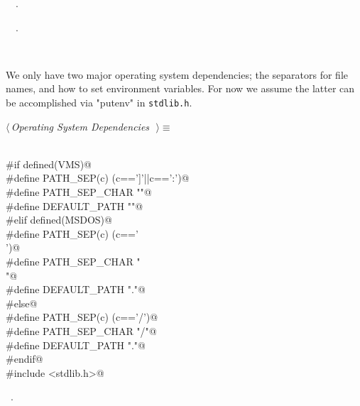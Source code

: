 \documentclass{report}
\begin{document}
\begin{flushleft}
\begin{minipage}{\linewidth}
\begin{list}{}{\setlength{\itemsep}{-\parsep}\setlength{\itemindent}{-\leftmargin}}
\item \NWtxtIdentsDefed\nobreak\  \verb@main@\nobreak\ \NWtxtIdentsNotUsed.\end{list}
\vspace{-2ex}
\footnotesize\addtolength{\baselineskip}{-1ex}
\begin{list}{}{\setlength{\itemsep}{-\parsep}\setlength{\itemindent}{-\leftmargin}}
\item \NWtxtIdentsUsed\nobreak\  \verb@exit@\nobreak\ .\end{list}
\end{minipage}\\[4ex]
\end{flushleft}
We only have two major operating system dependencies; the separators for
file names, and how to set environment variables.  
For now we assume the latter can be accomplished 
via "putenv" in \verb|stdlib.h|.
\begin{flushleft} \small
\begin{minipage}{\linewidth} \label{scrap15}
$\langle\,${\it Operating System Dependencies}\nobreak\ {\footnotesize {}}$\,\rangle\equiv$
\vspace{-1ex}
\begin{list}{}{} \item
\mbox{}\verb@@\\
\mbox{}\verb@#if defined(VMS)@\\
\mbox{}\verb@#define PATH_SEP(c) (c==']'||c==':')@\\
\mbox{}\verb@#define PATH_SEP_CHAR ""@\\
\mbox{}\verb@#define DEFAULT_PATH ""@\\
\mbox{}\verb@#elif defined(MSDOS)@\\
\mbox{}\verb@#define PATH_SEP(c) (c=='\\')@\\
\mbox{}\verb@#define PATH_SEP_CHAR "\\"@\\
\mbox{}\verb@#define DEFAULT_PATH "."@\\
\mbox{}\verb@#else@\\
\mbox{}\verb@#define PATH_SEP(c) (c=='/')@\\
\mbox{}\verb@#define PATH_SEP_CHAR "/"@\\
\mbox{}\verb@#define DEFAULT_PATH "."@\\
\mbox{}\verb@#endif@\\
\mbox{}\verb@#include <stdlib.h>@\\
\mbox{}\verb@@{\NWsep}
\end{list}
\vspace{-1ex}
\footnotesize\addtolength{\baselineskip}{-1ex}
\begin{list}{}{\setlength{\itemsep}{-\parsep}\setlength{\itemindent}{-\leftmargin}}
\item \NWtxtMacroRefIn\ .
\end{list}
\end{minipage}\\[4ex]
\end{flushleft}
\end{document}
